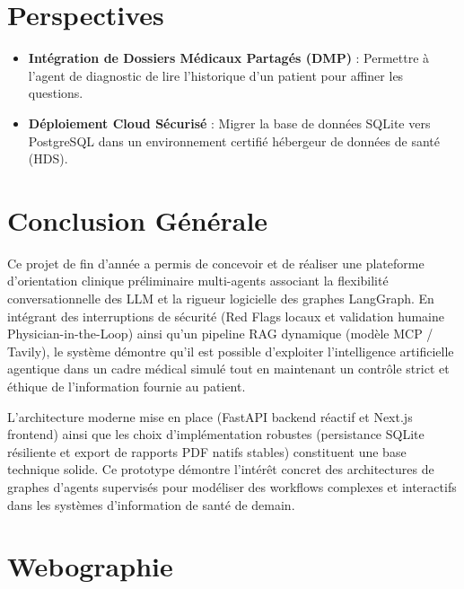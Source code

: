 \documentclass[11pt,a4paper]{report}
\begin{document}
\section{Perspectives}
\begin{itemize}
    \item \textbf{Intégration de Dossiers Médicaux Partagés (DMP)} : Permettre à l'agent de diagnostic de lire l'historique d'un patient pour affiner les questions.
    \item \textbf{Déploiement Cloud Sécurisé} : Migrer la base de données SQLite vers PostgreSQL dans un environnement certifié hébergeur de données de santé (HDS).
\end{itemize}

\newpage
\section*{Conclusion Générale}

Ce projet de fin d'année a permis de concevoir et de réaliser une plateforme d'orientation clinique préliminaire multi-agents associant la flexibilité conversationnelle des LLM et la rigueur logicielle des graphes LangGraph. En intégrant des interruptions de sécurité (Red Flags locaux et validation humaine Physician-in-the-Loop) ainsi qu'un pipeline RAG dynamique (modèle MCP / Tavily), le système démontre qu'il est possible d'exploiter l'intelligence artificielle agentique dans un cadre médical simulé tout en maintenant un contrôle strict et éthique de l'information fournie au patient.

L'architecture moderne mise en place (FastAPI backend réactif et Next.js frontend) ainsi que les choix d'implémentation robustes (persistance SQLite résiliente et export de rapports PDF natifs stables) constituent une base technique solide. Ce prototype démontre l'intérêt concret des architectures de graphes d'agents supervisés pour modéliser des workflows complexes et interactifs dans les systèmes d'information de santé de demain.

\newpage
\section*{Webographie}
\end{document}
